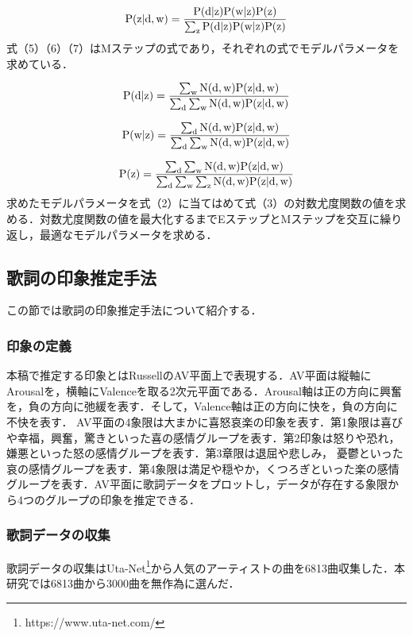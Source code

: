 \documentclass[a4paper,10pt,twocolumn]{jsarticle}
\begin{document}
\begin{equation}
\rm{P(z|d,w)=\frac{P(d|z)P(w|z)P(z)}{\sum_zP(d|z)P(w|z)P(z)}}
\end{equation}
式（5）（6）（7）はMステップの式であり，それぞれの式でモデルパラメータを求めている．

\begin{equation}
\rm{P(d|z)=\frac{\sum_wN(d,w)P(z|d,w)}{\sum_d\sum_wN(d,w)P(z|d,w)}}
\end{equation}

\begin{equation}
\rm{P(w|z)=\frac{\sum_dN(d,w)P(z|d,w)}{\sum_d\sum_wN(d,w)P(z|d,w)}}
\end{equation}

\begin{equation}
\rm{P(z)=\frac{\sum_d\sum_wN(d,w)P(z|d,w)}{\sum_d\sum_w\sum_zN(d,w)P(z|d,w)}}
\end{equation}
求めたモデルパラメータを式（2）に当てはめて式（3）の対数尤度関数の値を求める．対数尤度関数の値を最大化するまでEステップとMステップを交互に繰り返し，最適なモデルパラメータを求める．

\subsection{歌詞の印象推定手法}
この節では歌詞の印象推定手法について紹介する．

\subsubsection{印象の定義}
本稿で推定する印象とはRussellのAV平面上で表現する．AV平面は縦軸にArousalを，横軸にValenceを取る2次元平面である．Arousal軸は正の方向に興奮を，負の方向に弛緩を表す．そして，Valence軸は正の方向に快を，負の方向に不快を表す．
AV平面の4象限は大まかに喜怒哀楽の印象を表す．第1象限は喜びや幸福，興奮，驚きといった喜の感情グループを表す．第2印象は怒りや恐れ，嫌悪といった怒の感情グループを表す．第3章限は退屈や悲しみ，
憂鬱といった哀の感情グループを表す．第4象限は満足や穏やか，くつろぎといった楽の感情グループを表す．AV平面に歌詞データをプロットし，データが存在する象限から4つのグループの印象を推定できる．

\subsubsection{歌詞データの収集}
歌詞データの収集はUta-Net\footnote{https://www.uta-net.com/}から人気のアーティストの曲を6813曲収集した．本研究では6813曲から3000曲を無作為に選んだ．
\end{document}
